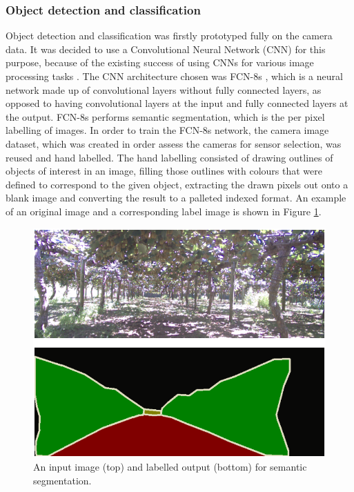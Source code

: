 \documentclass[preprint,authoryear,12pt]{elsarticle}
\begin{document}
\subsubsection{Object detection and classification}
    Object detection and classification was firstly prototyped fully on the camera data.
	It was decided to use a Convolutional Neural Network (CNN) for this purpose, because of the existing success of using CNNs for various image processing tasks \citep{LeCun2015}.
	The CNN architecture chosen was FCN-8s \citep{long2015}, which is a neural network made up of convolutional layers without fully connected layers, as opposed to having convolutional layers at the input and fully connected layers at the output.
	FCN-8s performs semantic segmentation, which is the per pixel labelling of images.
    In order to train the FCN-8s network, the camera image dataset, which was created in order assess the cameras for sensor selection, was reused and hand labelled.
	The hand labelling consisted of drawing outlines of objects of interest in an image, filling those outlines with colours that were defined to correspond to the given object, extracting the drawn pixels out onto a blank image and converting the result to a palleted indexed format.
	An example of an original image and a corresponding label image is shown in Figure \ref{fig:segImgLabelPair}.

    \begin{figure}[htb]
        \centering
        \includegraphics[width=\linewidth]{imgs/photos/segImgLabelPair.png}
        \caption{
            An input image (top) and labelled output (bottom) for semantic segmentation.
        }
        \label{fig:segImgLabelPair}
    \end{figure}
\end{document}
